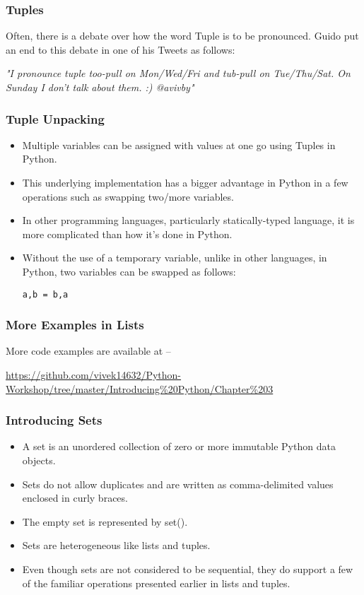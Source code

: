 \documentclass{beamer}
\begin{document}
\begin{frame}
\frametitle{Tuples}
Often, there is a debate over how the word Tuple is to be pronounced. Guido put an end to this debate in one of his Tweets as follows:

\textit{"I pronounce tuple too-pull on Mon/Wed/Fri and tub-pull on Tue/Thu/Sat. On Sunday I don't talk about them. :) @avivby"}
\end{frame}

\begin{frame}[fragile]
\frametitle{Tuple Unpacking}
\begin{itemize}
\item Multiple variables can be assigned with values at one go using Tuples in Python.
\item This underlying implementation has a bigger advantage in Python in a few  operations such as swapping two/more variables.
\item In other programming languages, particularly statically-typed language, it is more complicated than how it's done in Python.
\item Without the use of a temporary variable, unlike in other languages, in Python, two variables can be swapped as follows:
\begin{lstlisting}
a,b = b,a
\end{lstlisting}
\end{itemize}
\end{frame}

\begin{frame}
\frametitle{More Examples in Lists}
More code examples are available at --
 
\url{https://github.com/vivek14632/Python-Workshop/tree/master/Introducing\%20Python/Chapter\%203}
\end{frame}

\begin{frame}
\frametitle{Introducing Sets}
\begin{itemize}
\item A set is an unordered collection of zero or more immutable Python data objects. 
\item Sets do not allow duplicates and are written as comma-delimited values enclosed in curly braces. 
\item The empty set is represented by set(). \item Sets are heterogeneous like lists and tuples.
\item Even though sets are not considered to be sequential, they do support a few of the familiar operations presented earlier in lists and tuples.
\end{itemize}
\end{frame}
\end{document}

